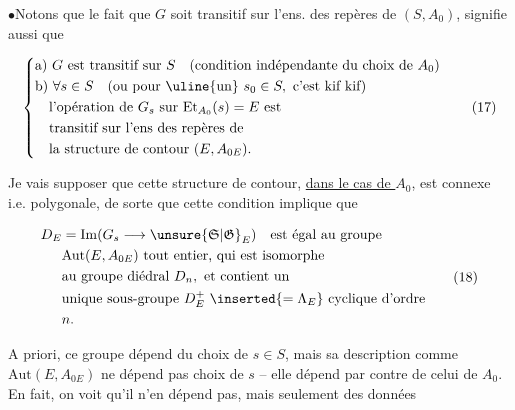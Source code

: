 
$\bullet$\quad Notons que le fait que $G$ soit transitif sur l'ens. des repères de $(S,A_0)$, signifie aussi que

\[
\left\{\begin{aligned}
 &\text{a) }G\text{ est transitif sur }S\quad\text{(condition indépendante du choix de }A_0\text{)}\\
 &\text{b) }\forall s\in S\quad\text{(ou pour \uline{un} }s_0\in S,\text{ c'est kif kif)}\\
 &\quad\text{l'opération de }G_s\text{ sur }\mathrm{Et}_{A_0}(s)=E\text{ est}\\
 &\quad\text{transitif sur l'ens des repères de}\\
 &\quad\text{la structure de contour }(E,A_{0E}).
\end{aligned}\right. \tag*{(17)}
\]

Je vais supposer que cette structure de contour,
\uline{dans le cas de $A_0$}, est connexe i.e. polygonale,
de sorte que cette condition implique que

\[
\begin{aligned}
 D_E&=\mathrm{Im}(G_s\longrightarrow\unsure{\mathfrak S|\mathfrak G}_E)\quad\text{est égal au groupe}\\
 &\mathrm{Aut}(E,A_{0E})\text{ tout entier, qui est isomorphe}\\
 &\text{au groupe diédral }D_n,\text{ et contient un}\\
 &\text{unique sous-groupe }D_E^+\ \inserted{=\Lambda_E}\ \text{cyclique d'ordre}\\
 &n.
\end{aligned}\tag*{(18)}
\]

A priori,  ce groupe dépend du choix de $s\in S$, mais
sa description comme $\mathrm{Aut}(E,A_{0E})$ ne dépend
pas  choix de $s$ -- elle dépend par contre de
celui de $A_0$. En fait, on voit qu'il n'en
dépend pas, mais seulement des données

